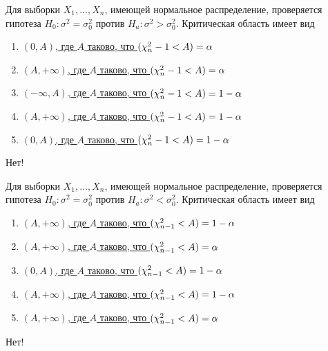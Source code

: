 \documentclass[t]{beamer}
\let\P\relax
\DeclareMathOperator{\P}{\mathbb{P}}
\begin{document}
 \begin{frame} \label{11-No} 
\begin{block}{11} 

  Для выборки $X_1,\ldots,X_n$, имеющей нормальное распределение, проверяется гипотеза $H_0: \sigma^2=\sigma_0^2$ против $H_a: \sigma^2 > \sigma_0^2$. Критическая область имеет вид
  


 \end{block} 
\begin{enumerate} 
\item[] \hyperlink{11-No}{\beamergotobutton{} $(0,A)$, где $A$ таково, что $\P(\chi^2_n-1 < A)  =\alpha$}
\item[] \hyperlink{11-No}{\beamergotobutton{} $(A,+\infty)$, где $A$ таково, что $\P(\chi^2_n-1 < A)  =\alpha$}
\item[] \hyperlink{11-No}{\beamergotobutton{} $(-\infty,A)$, где $A$ таково, что $\P(\chi^2_n-1 < A)  =1-\alpha$}
\item[] \hyperlink{11-Yes}{\beamergotobutton{} $(A,+\infty)$, где $A$ таково, что $\P(\chi^2_n-1 < A) =1-\alpha$}
\item[] \hyperlink{11-No}{\beamergotobutton{} $(0,A)$, где $A$ таково, что $\P(\chi^2_n-1 < A)  =1-\alpha$}
\end{enumerate} 

 \alert{Нет!} 
\end{frame} 


 \begin{frame} \label{12-No} 
\begin{block}{12} 

Для выборки $X_1,\ldots,X_n$, имеющей нормальное распределение, проверяется гипотеза $H_0: \sigma^2=\sigma_0^2$ против $H_a: \sigma^2 < \sigma_0^2$. Критическая область имеет вид



 \end{block} 
\begin{enumerate} 
\item[] \hyperlink{12-No}{\beamergotobutton{} $(A,+\infty)$, где $A$ таково, что $\P(\chi^2_{n-1} < A) =1-\alpha$}
\item[] \hyperlink{12-No}{\beamergotobutton{} $(A,+\infty)$, где $A$ таково, что $\P(\chi^2_{n-1} < A)  =\alpha$}
\item[] \hyperlink{12-No}{\beamergotobutton{} $(0,A)$, где $A$ таково, что $\P(\chi^2_{n-1} < A)  =1-\alpha$}
\item[] \hyperlink{12-Yes}{\beamergotobutton{} $(A,+\infty)$, где $A$ таково, что $\P(\chi^2_{n-1} < A) =1-\alpha$}
\item[] \hyperlink{12-No}{\beamergotobutton{} $(A,+\infty)$, где $A$ таково, что $\P(\chi^2_{n-1} < A)  =\alpha$}
\end{enumerate} 

 \alert{Нет!} 
\end{frame} 
\end{document}
